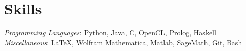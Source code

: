\section{Skills}
  {\sl Programming Languages}: Python, Java,  C, OpenCL, Prolog, Haskell \\
  {\sl Miscellaneous}: \LaTeX, Wolfram Mathematica, Matlab, SageMath, Git, Bash
\vspace{-3.5mm}
